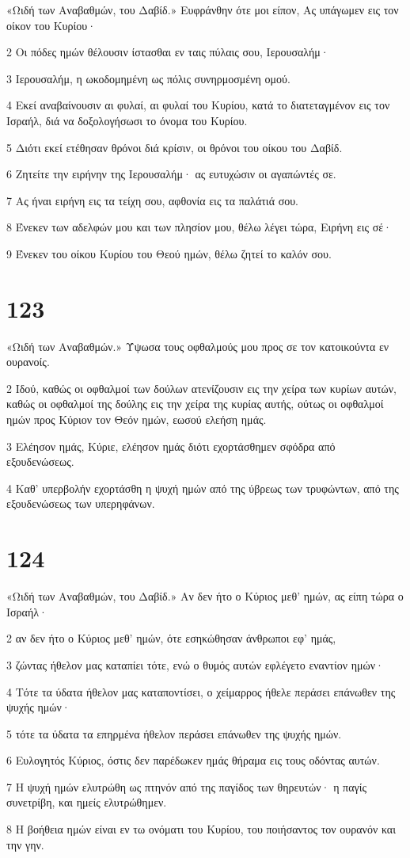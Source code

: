 \par «Ωιδή των Αναβαθμών, του Δαβίδ.» Ευφράνθην ότε μοι είπον, Ας υπάγωμεν εις τον οίκον του Κυρίου·
\par 2 Οι πόδες ημών θέλουσιν ίστασθαι εν ταις πύλαις σου, Ιερουσαλήμ·
\par 3 Ιερουσαλήμ, η ωκοδομημένη ως πόλις συνηρμοσμένη ομού.
\par 4 Εκεί αναβαίνουσιν αι φυλαί, αι φυλαί του Κυρίου, κατά το διατεταγμένον εις τον Ισραήλ, διά να δοξολογήσωσι το όνομα του Κυρίου.
\par 5 Διότι εκεί ετέθησαν θρόνοι διά κρίσιν, οι θρόνοι του οίκου του Δαβίδ.
\par 6 Ζητείτε την ειρήνην της Ιερουσαλήμ· ας ευτυχώσιν οι αγαπώντές σε.
\par 7 Ας ήναι ειρήνη εις τα τείχη σου, αφθονία εις τα παλάτιά σου.
\par 8 Ένεκεν των αδελφών μου και των πλησίον μου, θέλω λέγει τώρα, Ειρήνη εις σέ·
\par 9 Ένεκεν του οίκου Κυρίου του Θεού ημών, θέλω ζητεί το καλόν σου.

\chapter{123}

\par «Ωιδή των Αναβαθμών.» Ύψωσα τους οφθαλμούς μου προς σε τον κατοικούντα εν ουρανοίς.
\par 2 Ιδού, καθώς οι οφθαλμοί των δούλων ατενίζουσιν εις την χείρα των κυρίων αυτών, καθώς οι οφθαλμοί της δούλης εις την χείρα της κυρίας αυτής, ούτως οι οφθαλμοί ημών προς Κύριον τον Θεόν ημών, εωσού ελεήση ημάς.
\par 3 Ελέησον ημάς, Κύριε, ελέησον ημάς διότι εχορτάσθημεν σφόδρα από εξουδενώσεως.
\par 4 Καθ' υπερβολήν εχορτάσθη η ψυχή ημών από της ύβρεως των τρυφώντων, από της εξουδενώσεως των υπερηφάνων.

\chapter{124}

\par «Ωιδή των Αναβαθμών, του Δαβίδ.» Αν δεν ήτο ο Κύριος μεθ' ημών, ας είπη τώρα ο Ισραήλ·
\par 2 αν δεν ήτο ο Κύριος μεθ' ημών, ότε εσηκώθησαν άνθρωποι εφ' ημάς,
\par 3 ζώντας ήθελον μας καταπίει τότε, ενώ ο θυμός αυτών εφλέγετο εναντίον ημών·
\par 4 Τότε τα ύδατα ήθελον μας καταποντίσει, ο χείμαρρος ήθελε περάσει επάνωθεν της ψυχής ημών·
\par 5 τότε τα ύδατα τα επηρμένα ήθελον περάσει επάνωθεν της ψυχής ημών.
\par 6 Ευλογητός Κύριος, όστις δεν παρέδωκεν ημάς θήραμα εις τους οδόντας αυτών.
\par 7 Η ψυχή ημών ελυτρώθη ως πτηνόν από της παγίδος των θηρευτών· η παγίς συνετρίβη, και ημείς ελυτρώθημεν.
\par 8 Η βοήθεια ημών είναι εν τω ονόματι του Κυρίου, του ποιήσαντος τον ουρανόν και την γην.

